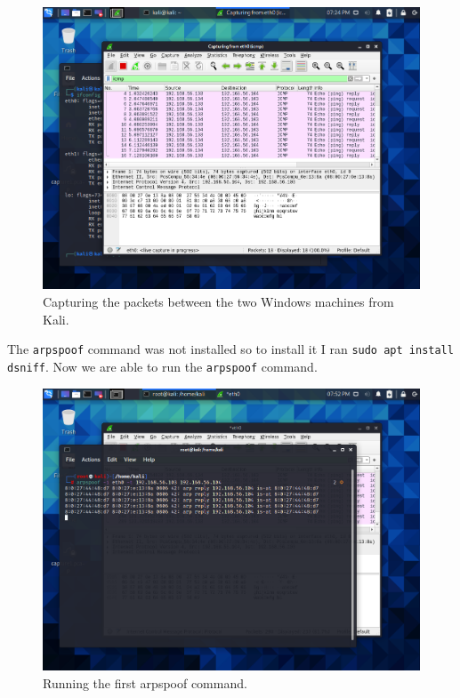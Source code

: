 \begin{figure}[H]
    \centering
    \includegraphics[width=\linewidth]{figures/wireshark-initial.png}
    \caption{Capturing the packets between the two Windows machines from Kali.}
    \label{fig:wireshark-initial}
\end{figure}

The \verb|arpspoof| command was not installed so to install it I ran \verb|sudo apt install dsniff|.
Now we are able to run the \verb|arpspoof| command.

\begin{figure}[H]
    \centering
    \includegraphics[width=\linewidth]{figures/arpspoof-initial.png}
    \caption{Running the first arpspoof command.}
    \label{fig:aprspoof-1}
\end{figure}

